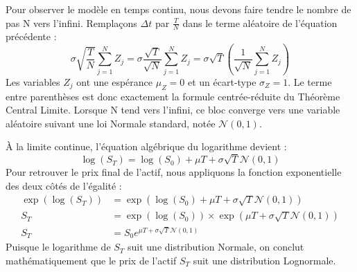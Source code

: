 \begin{theorembox}
Pour observer le modèle en temps continu, nous devons faire tendre le nombre de pas N vers l'infini. 
Remplaçons $\Delta t$ par $\frac{T}{N}$ dans le terme aléatoire de l'équation précédente :
\begin{equation*}
    \sigma \sqrt{\frac{T}{N}} \sum_{j=1}^{N} Z_j = \sigma \frac{\sqrt{T}}{\sqrt{N}} \sum_{j=1}^{N} Z_j = \sigma \sqrt{T} \left( \frac{1}{\sqrt{N}} \sum_{j=1}^{N} Z_j \right)
\end{equation*}
Les variables $Z_j$ ont une espérance $\mu_Z = 0$ et un écart-type $\sigma_Z = 1$. Le terme entre parenthèses est donc exactement la formule centrée-réduite du Théorème Central Limite. Lorsque N tend vers l'infini, ce bloc converge vers une variable aléatoire suivant une loi Normale standard, notée $\mathcal{N}(0,1)$.

À la limite continue, l'équation algébrique du logarithme devient :
\begin{equation*}
    \log(S_T) = \log(S_0) + \mu T + \sigma \sqrt{T} \mathcal{N}(0,1)
\end{equation*}
Pour retrouver le prix final de l'actif, nous appliquons la fonction exponentielle des deux côtés de l'égalité :
\begin{align*}
    \exp(\log(S_T)) &= \exp\left( \log(S_0) + \mu T + \sigma \sqrt{T} \mathcal{N}(0,1) \right) \\
    S_T &= \exp(\log(S_0)) \times \exp\left( \mu T + \sigma \sqrt{T} \mathcal{N}(0,1) \right) \\
    S_T &= S_0 e^{\mu T + \sigma \sqrt{T} \mathcal{N}(0,1)}
\end{align*}
Puisque le logarithme de $S_T$ suit une distribution Normale, on conclut mathématiquement que le prix de l'actif $S_T$ suit une distribution Lognormale.
\end{theorembox}